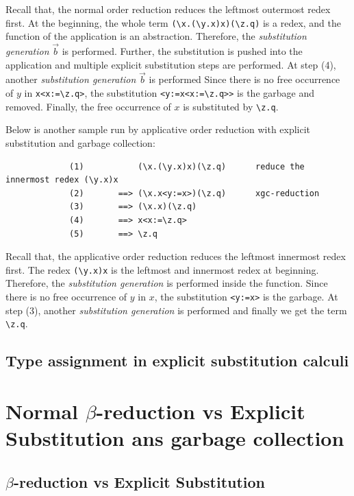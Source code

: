Recall that, the normal order reduction reduces the leftmost outermost redex first. At the beginning, the whole term \verb|(\x.(\y.x)x)(\z.q)| is a redex, and the function of the application is an abstraction. Therefore, the \textit{substitution generation} $\overrightarrow{b}$ is performed. Further, the substitution is pushed into the application and multiple explicit substitution steps are performed. At step (4), another \textit{substitution generation} $\overrightarrow{b}$ is performed Since there is no free occurrence of $y$ in \verb|x<x:=\z.q>|, the substitution \verb|<y:=x<x:=\z.q>>| is the garbage and removed. Finally, the free occurrence of $x$ is substituted by \verb|\z.q|.

\begin{exmp}
\normalfont Below is another sample run by applicative order reduction with explicit substitution and garbage collection:
\end{exmp}
\begin{verbatim}
             (1)           (\x.(\y.x)x)(\z.q)      reduce the innermost redex (\y.x)x
             (2)       ==> (\x.x<y:=x>)(\z.q)      xgc-reduction
             (3)       ==> (\x.x)(\z.q)
             (4)       ==> x<x:=\z.q>
             (5)       ==> \z.q
\end{verbatim}

Recall that, the applicative order reduction reduces the leftmost innermost redex first. The redex \verb|(\y.x)x| is the leftmost and innermost redex at beginning. Therefore, the \textit{substitution generation} is performed inside the function. Since there is no free occurrence of $y$ in $x$, the substitution \verb|<y:=x>| is the garbage. At step (3), another \textit{substitution generation} is performed and finally we get the term \verb|\z.q|. 

\subsection{Type assignment in explicit substitution calculi}


\section{Normal $\beta$-reduction vs Explicit Substitution ans garbage collection}

\subsection{$\beta$-reduction vs Explicit Substitution}

